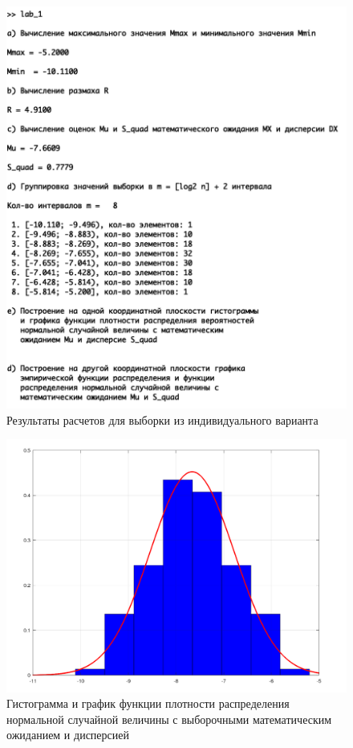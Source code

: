 \documentclass[a4paper,14pt, unknownkeysallowed]{extreport}
\begin{document}
\begin{figure}[h]
	\centering
	\includegraphics[scale=0.95]{img/result.png}
	\caption{Результаты расчетов для выборки из индивидуального варианта}
	\label{fig:result}
\end{figure}

\begin{figure}[h]
	\centering
	\includegraphics[scale=0.5]{img/histo.png}
	\caption{Гистограмма и график функции плотности распределения нормальной случайной величины с выборочными математическим ожиданием и дисперсией}
	\label{fig:histo}
\end{figure}
\end{document}
